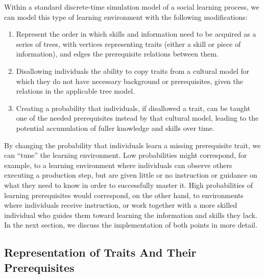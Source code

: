 \documentclass[referee,graybox,natbib]{svmult}
\begin{document}
Within a standard discrete-time simulation model of a social learning
process, we can model this type of learning environment with the
following modifications:

\begin{enumerate}
\def\labelenumi{\arabic{enumi}.}
\itemsep1pt\parskip0pt
\item
  Represent the order in which skills and information need to be
  acquired as a series of trees, with vertices representing traits
  (either a skill or piece of information), and edges the prerequisite
  relations between them.
\item
  Disallowing individuals the ability to copy traits from a cultural
  model for which they do not have necessary background or
  prerequisites, given the relations in the applicable tree model.
\item
  Creating a probability that individuals, if disallowed a trait, can be
  taught one of the needed prerequisites instead by that cultural model,
  leading to the potential accumulation of fuller knowledge and skills
  over time.
\end{enumerate}

By changing the probability that individuals learn a missing
prerequisite trait, we can ``tune'' the learning environment. Low
probabilities might correspond, for example, to a learning environment
where individuals can observe others executing a production step, but
are given little or no instruction or guidance on what they need to know
in order to successfully master it. High probabilities of learning
prerequisites would correspond, on the other hand, to environments where
individuals receive instruction, or work together with a more skilled
individual who guides them toward learning the information and skills
they lack. In the next section, we discuss the implementation of both
points in more detail.

\subsection{Representation of Traits And Their
Prerequisites}\label{representation-of-traits-and-their-prerequisites}
\end{document}
